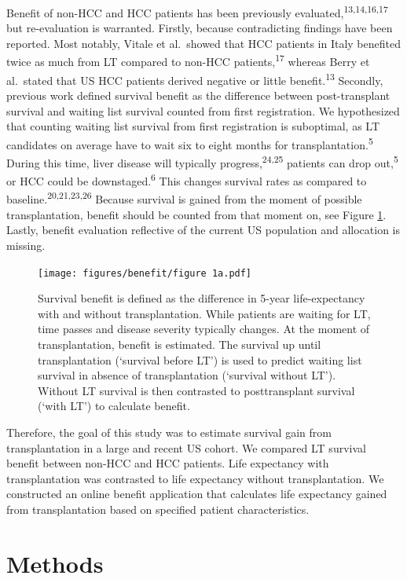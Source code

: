 \documentclass[11pt,english,]{book} %
\begin{document}
Benefit of non-HCC and HCC patients has been previously evaluated,\textsuperscript{13,14,16,17} but re-evaluation is warranted. Firstly, because contradicting findings have been reported. Most notably, Vitale et al.~showed that HCC patients in Italy benefited twice as much from LT compared to non-HCC patients,\textsuperscript{17} whereas Berry et al.~stated that US HCC patients derived negative or little benefit.\textsuperscript{13} Secondly, previous work defined survival benefit as the difference between post-transplant survival and waiting list survival counted from first registration. We hypothesized that counting waiting list survival from first registration is suboptimal, as LT candidates on average have to wait six to eight months for transplantation.\textsuperscript{5} During this time, liver disease will typically progress,\textsuperscript{24,25} patients can drop out,\textsuperscript{5} or HCC could be downstaged.\textsuperscript{6} This changes survival rates as compared to baseline.\textsuperscript{20,21,23,26} Because survival is gained from the moment of possible transplantation, benefit should be counted from that moment on, see Figure \ref{fig:benefit-fig1a}. Lastly, benefit evaluation reflective of the current US population and allocation is missing.

\begin{figure}
\centering
\texttt{[image: figures/benefit/figure 1a.pdf]}
\caption{\label{fig:benefit-fig1a}Survival benefit is defined as the difference in 5-year life-expectancy with and without transplantation. While patients are waiting for LT, time passes and disease severity typically changes. At the moment of transplantation, benefit is estimated. The survival up until transplantation (`survival before LT') is used to predict waiting list survival in absence of transplantation (`survival without LT'). Without LT survival is then contrasted to posttransplant survival (`with LT') to calculate benefit.}
\end{figure}

Therefore, the goal of this study was to estimate survival gain from transplantation in a large and recent US cohort. We compared LT survival benefit between non-HCC and HCC patients. Life expectancy with transplantation was contrasted to life expectancy without transplantation. We constructed an online benefit application that calculates life expectancy gained from transplantation based on specified patient characteristics.

\hypertarget{methods-4}{%
\section*{Methods}\label{methods-4}}
\end{document}
